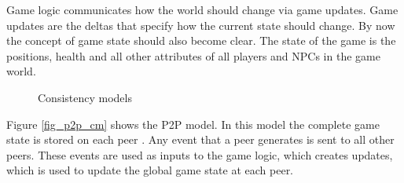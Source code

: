 \documentclass[journal,oneside,a4paper,onecolumn]{IEEEtran}
\begin{document}
Game logic communicates how the world should change via game updates. Game updates are the deltas that specify how the current state should change. By now the concept of game state should also become clear. The state of the game is the positions, health and all other attributes of all players and NPCs in the game world.

\begin{figure}[htbp]
\centering
{}
\caption{Consistency models}
\end{figure}
%
Figure \ref{fig_p2p_cm} shows the P2P model. In this model the complete game state is stored on each peer \cite{}. Any event that a peer generates is sent to all other peers. These events are used as inputs to the game logic, which creates updates, which is used to update the global game state at each peer.
\end{document}
